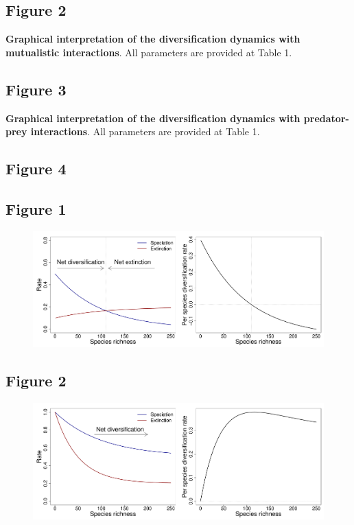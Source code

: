 \documentclass[12pt]{article}
\begin{document}
\subsection*{Figure 2}

\textbf{Graphical interpretation of the diversification dynamics with mutualistic interactions}. All parameters are provided at Table 1. 

\subsection*{Figure 3}

\textbf{Graphical interpretation of the diversification dynamics with predator-prey interactions}. All parameters are provided at Table 1. 

\subsection*{Figure 4}

\newpage


\subsection*{Figure 1}

\begin{figure}[ht!]
\centering\includegraphics[width=1\textwidth]{figures/competition}
\end{figure}

\newpage

\subsection*{Figure 2}

\begin{figure}[ht!]
\centering\includegraphics[width=1\textwidth]{figures/mutualism}
\end{figure}
\end{document}
